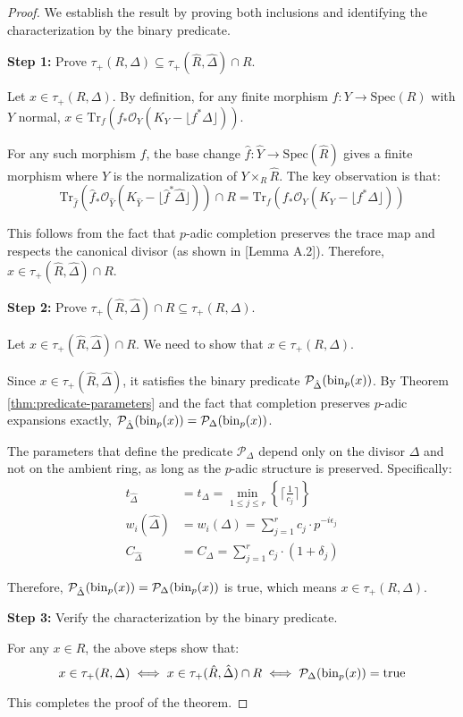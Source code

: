 \begin{proof}
We establish the result by proving both inclusions and identifying the characterization by the binary predicate.

\textbf{Step 1:} Prove $\tau_+(R,\Delta) \subseteq \tau_+(\hat{R},\hat{\Delta}) \cap R$.

Let $x \in \tau_+(R,\Delta)$. By definition, for any finite morphism $f: Y \to \text{Spec}(R)$ with $Y$ normal, $x \in \text{Tr}_f(f_*\mathcal{O}_Y(K_Y - \lfloor f^*\Delta\rfloor))$. 

For any such morphism $f$, the base change $\hat{f}: \hat{Y} \to \text{Spec}(\hat{R})$ gives a finite morphism where $\hat{Y}$ is the normalization of $Y \times_R \hat{R}$. The key observation is that:
$$\text{Tr}_{\hat{f}}(\hat{f}_*\mathcal{O}_{\hat{Y}}(K_{\hat{Y}} - \lfloor \hat{f}^*\hat{\Delta}\rfloor)) \cap R = \text{Tr}_f(f_*\mathcal{O}_Y(K_Y - \lfloor f^*\Delta\rfloor))$$

This follows from the fact that $p$-adic completion preserves the trace map and respects the canonical divisor (as shown in [Lemma A.2]). Therefore, $x \in \tau_+(\hat{R},\hat{\Delta}) \cap R$.

\textbf{Step 2:} Prove $\tau_+(\hat{R},\hat{\Delta}) \cap R \subseteq \tau_+(R,\Delta)$.

Let $x \in \tau_+(\hat{R},\hat{\Delta}) \cap R$. We need to show that $x \in \tau_+(R,\Delta)$.

Since $x \in \tau_+(\hat{R},\hat{\Delta})$, it satisfies the binary predicate $\mathcal{P}_{\hat{\Delta}}(\operatorname{bin}_p(x))$. By Theorem \ref{thm:predicate-parameters} and the fact that completion preserves $p$-adic expansions exactly, $\mathcal{P}_{\hat{\Delta}}(\operatorname{bin}_p(x)) = \mathcal{P}_{\Delta}(\operatorname{bin}_p(x))$.

The parameters that define the predicate $\mathcal{P}_{\Delta}$ depend only on the divisor $\Delta$ and not on the ambient ring, as long as the $p$-adic structure is preserved. Specifically:
\begin{align*}
t_{\hat{\Delta}} &= t_{\Delta} = \min_{1 \leq j \leq r} \left\{\lceil\frac{1}{c_j}\rceil\right\} \\
w_i(\hat{\Delta}) &= w_i(\Delta) = \sum_{j=1}^{r} c_j \cdot p^{-i\epsilon_j} \\
C_{\hat{\Delta}} &= C_{\Delta} = \sum_{j=1}^{r} c_j \cdot (1 + \delta_j)
\end{align*}

Therefore, $\mathcal{P}_{\hat{\Delta}}(\operatorname{bin}_p(x)) = \mathcal{P}_{\Delta}(\operatorname{bin}_p(x))$ is true, which means $x \in \tau_+(R,\Delta)$.

\textbf{Step 3:} Verify the characterization by the binary predicate.

For any $x \in R$, the above steps show that:
$$x \in \tau_+(R,\Delta) \iff x \in \tau_+(\hat{R},\hat{\Delta}) \cap R \iff \mathcal{P}_{\Delta}(\operatorname{bin}_p(x)) = \text{true}$$

This completes the proof of the theorem.
\end{proof}

